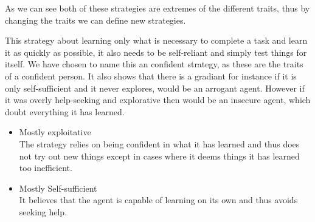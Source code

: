 \documentclass[\master/Master.tex]{subfiles}
\begin{document}
    As we can see both of these strategies are extremes of the different
    traits, thus by changing the traits we can define new strategies.
    \begin{example}
    [{Confident}] This strategy about learning only
    what is necessary to complete a task and learn it as quickly as possible,
    it also needs to be self-reliant and simply test things for itself. We have chosen to name this an confident strategy, as these are the traits of a confident person. It also shows that there is a gradiant for instance if it is only self-sufficient and it never explores, would be an arrogant agent. However if it was overly help-seeking and explorative then would be an insecure agent, which doubt everything it has learned.
    
    \begin{itemize}
    \item Mostly exploitative\\
    The strategy relies on being confident in what it has learned and
    thus does not try out new things except in cases where it deems things it has learned too inefficient.
    \item Mostly Self-sufficient\\
    It believes that the agent is capable of learning on its own and thus avoids seeking help.
    \end{itemize}

	\end{example}
\end{document}
